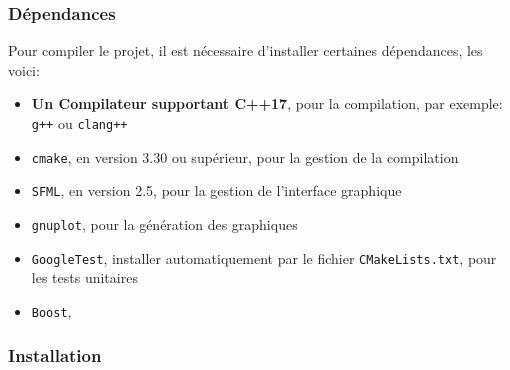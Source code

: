 \subsubsection{Dépendances}\label{subsubsec:dependances}
Pour compiler le projet, il est nécessaire d'installer certaines dépendances, les voici:

\begin{itemize}
    \item \textbf{Un Compilateur supportant C++17}, pour la compilation, par exemple: \texttt{g++} ou \texttt{clang++}
    \item \texttt{cmake}, en version 3.30 ou supérieur, pour la gestion de la compilation
    \item \texttt{SFML}, en version 2.5, pour la gestion de l'interface graphique
    \item \texttt{gnuplot}, pour la génération des graphiques
    \item \texttt{GoogleTest}, installer automatiquement par le fichier \texttt{CMakeLists.txt}, pour les tests unitaires
    \item \texttt{Boost},
\end{itemize}

\subsubsection{Installation}\label{subsubsec:installation}